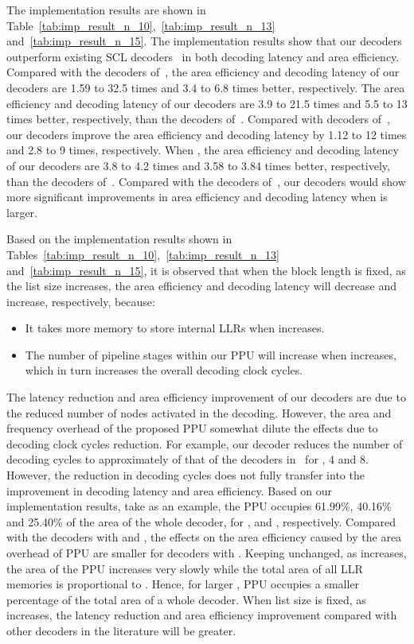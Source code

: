 \documentclass[journal]{IEEEtran}
\begin{document}
The implementation results are shown in Table~\ref{tab:imp_result_n_10},~\ref{tab:imp_result_n_13} and~\ref{tab:imp_result_n_15}. The implementation results show that our decoders outperform existing SCL decoders~\cite{llr_list_tsp,jun_low_mem_list,yuan_low_latency} in both decoding latency and area efficiency. Compared with the decoders of~\cite{llr_list_tsp}, the area efficiency and decoding latency of our decoders are 1.59 to 32.5 times and 3.4 to 6.8 times better, respectively. The area efficiency and decoding latency of our decoders are 3.9 to 21.5 times and 5.5 to 13 times better, respectively, than the decoders of~\cite{jun_low_mem_list}. Compared with decoders of~\cite{chenrong_tsp}, our decoders improve the area efficiency and decoding latency by 1.12 to 12 times and 2.8 to 9 times, respectively. When , the area efficiency and decoding latency of our decoders are 3.8 to 4.2 times and 3.58 to 3.84 times better, respectively, than the decoders of~\cite{yuan_low_latency}. Compared with the decoders of~\cite{yuan_low_latency}, our decoders would show more significant improvements in area efficiency and decoding latency when  is larger.


Based on the implementation results shown in Tables~\ref{tab:imp_result_n_10},~\ref{tab:imp_result_n_13} and~\ref{tab:imp_result_n_15}, it is observed that when the block length is fixed, as the list size  increases, the area efficiency and decoding latency will decrease and increase, respectively, because:
\begin{itemize}
\item It takes more memory to store internal LLRs when  increases.
\item The number of pipeline stages within our PPU will increase when  increases, which in turn increases the overall decoding clock cycles.
\end{itemize}

The latency reduction and area efficiency improvement of our decoders are due to the reduced number of nodes activated in the decoding. However, the area and frequency overhead of the proposed PPU somewhat dilute the effects due to decoding clock cycles reduction. For example, our decoder reduces the number of decoding cycles to approximately  of that of the decoders in~\cite{llr_list_tsp} for , 4 and 8. However, the reduction in decoding cycles does not fully transfer into the improvement in decoding latency and area efficiency. Based on our implementation results, take  as an example, the PPU occupies 61.99\%, 40.16\% and 25.40\% of the area of the whole decoder, for ,  and , respectively. Compared with the decoders with  and , the effects on the area efficiency caused by the area overhead of PPU are smaller for decoders with . Keeping  unchanged, as  increases, the area of the PPU increases very slowly while the total area of all LLR memories is proportional to . Hence, for larger , PPU occupies a smaller percentage of the total area of a whole decoder. When list size  is fixed, as  increases, the latency reduction and area efficiency improvement compared with other decoders in the literature will be greater.
\end{document}
